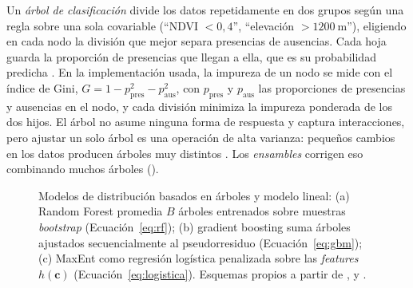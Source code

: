 Un \emph{árbol de clasificación} divide los datos repetidamente en dos
grupos según una regla sobre una sola covariable (``NDVI $< 0{,}4$'',
``elevación $> \SI{1200}{\metre}$''), eligiendo en cada nodo la división que
mejor separa presencias de ausencias. Cada hoja guarda la proporción de
presencias que llegan a ella, que es su probabilidad predicha
\citep[p.~190]{guisan2017hsdm}. En la implementación usada, la impureza de
un nodo se mide con el índice de Gini, $G = 1 - p_{\mathrm{pres}}^2 -
p_{\mathrm{aus}}^2$, con $p_{\mathrm{pres}}$ y $p_{\mathrm{aus}}$ las
proporciones de presencias y ausencias en el nodo, y cada división minimiza la impureza ponderada de los dos hijos. El árbol no asume
ninguna forma de respuesta y captura interacciones, pero ajustar un solo
árbol es una operación de alta varianza: pequeños cambios en los datos
producen árboles muy distintos \citep[pp.~194, 203]{guisan2017hsdm}. Los
\emph{ensambles} corrigen eso combinando muchos árboles
().

\begin{figure}[!htb]
  \centering
  \caption{Modelos de distribución basados en árboles y modelo lineal:
  (a) Random Forest promedia $B$ árboles entrenados sobre muestras
  \textit{bootstrap} (Ecuación~\ref{eq:rf}); (b) gradient boosting suma
  árboles ajustados secuencialmente al pseudorresiduo
  (Ecuación~\ref{eq:gbm}); (c) MaxEnt como regresión logística penalizada
  sobre las \textit{features} $h(\mathbf{c})$ (Ecuación~\ref{eq:logistica}).
  Esquemas propios a partir de \citet{breiman2001rf},
  \citet{friedman2001gbm} y \citet{elith2011maxent}.}
  \label{fig:arboles}
\end{figure}

